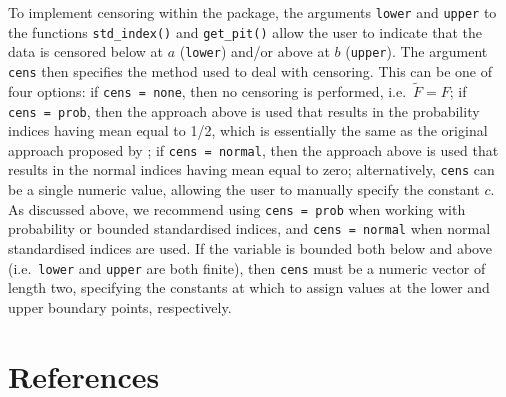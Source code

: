 To implement censoring within the  package, the arguments \texttt{lower} and \texttt{upper} to the functions \texttt{std\_index()} and \texttt{get\_pit()} allow the user to indicate that the data is censored below at \(a\) (\texttt{lower}) and/or above at \(b\) (\texttt{upper}). The argument \texttt{cens} then specifies the method used to deal with censoring. This can be one of four options: if \texttt{cens\ =\ \textquotesingle{}none\textquotesingle{}}, then no censoring is performed, i.e.~\(\tilde{F} = F\); if \texttt{cens\ =\ \textquotesingle{}prob\textquotesingle{}}, then the approach above is used that results in the probability indices having mean equal to 1/2, which is essentially the same as the original approach proposed by \cite{StaggeEtAl2015}; if \texttt{cens\ =\ \textquotesingle{}normal\textquotesingle{}}, then the approach above is used that results in the normal indices having mean equal to zero; alternatively, \texttt{cens} can be a single numeric value, allowing the user to manually specify the constant \(c\). As discussed above, we recommend using \texttt{cens\ =\ \textquotesingle{}prob\textquotesingle{}} when working with probability or bounded standardised indices, and \texttt{cens\ =\ \textquotesingle{}normal\textquotesingle{}} when normal standardised indices are used. If the variable is bounded both below and above (i.e.~\texttt{lower} and \texttt{upper} are both finite), then \texttt{cens} must be a numeric vector of length two, specifying the constants at which to assign values at the lower and upper boundary points, respectively.

\section{References}\label{references}



\address{%
Sam Allen\\
ETH Zürich\\%
Seminar for Statistics\\ Rämistrasse 101\\ 8092 Zurich, Switzerland\\
%
%
\textit{ORCiD: \href{https://orcid.org/0000-0003-1971-8277}{0000-0003-1971-8277}}\\%
\href{mailto:sam.allen@stat.math.ethz.ch}{\nolinkurl{sam.allen@stat.math.ethz.ch}}%
}

\address{%
Noelia Otero\\
University of Bern and Oeschger Centre for Climate Change Research\\%
Institute of Geography\\ Hallerstrasse 12\\ 3012 Bern, Switzerland\\
%
%
\textit{ORCiD: \href{https://orcid.org/0000-0003-3217-3945}{0000-0003-3217-3945}}\\%
\href{mailto:noelia.otero@unibe.ch}{\nolinkurl{noelia.otero@unibe.ch}}%
}
